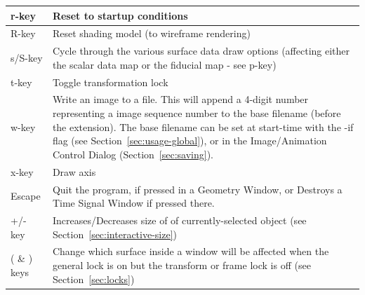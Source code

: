 \begin{table}[htbp]
\begin{center}
\begin{tabular}{|l|p{6in}|}
        r-key   &       Reset to startup conditions \\ \hline
        R-key   &       Reset shading model (to wireframe rendering) \\ \hline
        s/S-key   &      Cycle through the various surface data draw 
        options (affecting either the scalar data map or the fiducial map - see p-key)\\ \hline
        t-key   &       Toggle transformation lock \\ \hline
        w-key   &       Write an image to a file.  This will append a 4-digit 
                        number representing a image sequence number to the 
                        base filename (before the extension).  The base 
                        filename can be set at start-time with the -if flag 
                        (see Section~\ref{sec:usage-global}), or in the 
                        Image/Animation Control Dialog (Section~\ref{sec:saving}).  \\ \hline
        x-key   &       Draw axis \\ \hline
        Escape  &       Quit the program, if pressed in a Geometry Window, 
            or Destroys a Time Signal Window if pressed there. \\ \hline
        +/- key   &    Increases/Decreases size of of currently-selected object
       (see Section~\ref{sec:interactive-size})\\ \hline
       ( \& ) keys   &  Change which surface inside a window will be affected
            when the general lock is on but the transform or frame lock is off
            (see Section~\ref{sec:locks})\\ \hline
\end{tabular}
\end{center}

\end{table} 

